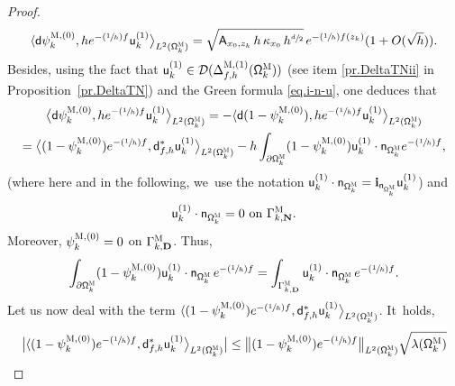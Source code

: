 \documentclass[JEP,XML,SOM,Unicode,NoEqCountersInSection,NoFloatCountersInSection,published]{cedram}
\newcommand{\Psfrac}[2]{(\sfrac{#1}{#2})}
\newcommand{\mbf}[1]{\mathbf{#1}}
\let\pa\partial
\theoremstyle{plain}
\theoremstyle{definition}
\begin{document}
\begin{proof}
\begin{equation}\label{eq.P11}
\langle \mathsf d \psi^{\textsc{M},(0)}_k, h e^{-\Psfrac 1hf} \mathsf u^{(1)}_k \big \rangle_{ L^2(\mathsf \Omega_k^{\textsc{M}})}=\sqrt{\mathsf A_{x_0,z_k}\, h\, \kappa_{x_0}\, h^{\sfrac d2}}\, e^{-\Psfrac 1h f(z_k)} (1+O(\sqrt h)).
\end{equation}
\pagebreak[2]
Besides, using the fact that $\mathsf
u^{(1)}_k \in \mathcal D(\Delta_{f,h}^{\textsc{M},(1)} (\mathsf
\Omega_k^{\textsc{M}}))$ (see item \eqref{pr.DeltaTNii} in
Proposition~\ref{pr.DeltaTN}) and the Green formula \eqref{eq.i-n-u}, one deduces that
\begin{multline}
\label{eq.P12}
\bigl\langle \mathsf d \psi^{\textsc{M},(0)}_k, h e^{-\Psfrac 1hf} \mathsf u^{(1)}_k \big \rangle_{ L^2(\mathsf \Omega_k^{\textsc{M}})}= -\langle \mathsf d (1- \psi^{\textsc{M},(0)}_k), h e^{-\Psfrac 1hf} \mathsf u^{(1)}_k \big \rangle_{ L^2(\mathsf \Omega_k^{\textsc{M}})}\\
= \bigl\langle (1- \psi^{\textsc{M},(0)}_k) e^{-\Psfrac 1hf}, \mathsf d_{f,h}^* \mathsf u^{(1)}_k \big \rangle_{ L^2(\mathsf \Omega_k^{\textsc{M}})} -h\int_{\pa \mathsf \Omega_k^{\textsc{M}}} (1- \psi^{\textsc{M},(0)}_k) \mathsf u^{(1)}_k \cdot \mathsf n_{ \mathsf \Omega_k^{\textsc{M}} } e^{-\Psfrac 1hf},
\end{multline}
(where here and in the following, we~use the notation $ \mathsf
u^{(1)}_k \cdot \mathsf n_{ \mathsf \Omega_k^{\textsc{M}}
}=\mathbf{i}_{\mathsf n_{ \mathsf \Omega_k^{\textsc{M}}
}} \mathsf
u^{(1)}_k$) and
\[
\mathsf u^{(1)}_k
\cdot \mathsf n_{ \mathsf \Omega_k^{\textsc{M}} }= 0 \text{ on } \Gamma_{k,\mbf N}^{\textsc{M}}.
\]
Moreover, $\psi^{\textsc{M},(0)}_k=0$ on $\Gamma_{k,\mbf
D}^{\textsc{M}}$. Thus,
\begin{equation}\label{eq.P13}
\int_{\pa \mathsf \Omega_k^{\textsc{M}}} (1- \psi^{\textsc{M},(0)}_k) \mathsf u^{(1)}_k \cdot \mathsf n_{ \mathsf \Omega_k^{\textsc{M}} } \, e^{-\Psfrac 1hf}=\int_{\Gamma_{k,\mbf D}^{\textsc{M}}} \mathsf u^{(1)}_k \cdot \mathsf n_{ \mathsf \Omega_k^{\textsc{M}} } \, e^{-\Psfrac 1hf}.
\end{equation}
Let us now deal with the term $\langle (1- \psi^{\textsc{M},(0)}_k) e^{-\Psfrac 1hf}, \mathsf d_{f,h}^* \mathsf u^{(1)}_k \big \rangle_{ L^2(\mathsf \Omega_k^{\textsc{M}})}$. It~holds,
\begin{align*}
\bigl \vert \langle (1- \psi^{\textsc{M},(0)}_k) e^{-\Psfrac 1hf}, \mathsf d_{f,h}^* \mathsf u^{(1)}_k \bigr \rangle_{ L^2(\mathsf \Omega_k^{\textsc{M}})}\big \vert &\le\bigl \Vert (1- \psi^{\textsc{M},(0)}_k) e^{-\Psfrac 1hf} \bigr \Vert_{ L^2(\mathsf \Omega_k^{\textsc{M}})} \sqrt{\lambda(\mathsf \Omega_k^{\textsc{M}}) }\\

\end{align*}
\end{proof}
\end{document}
